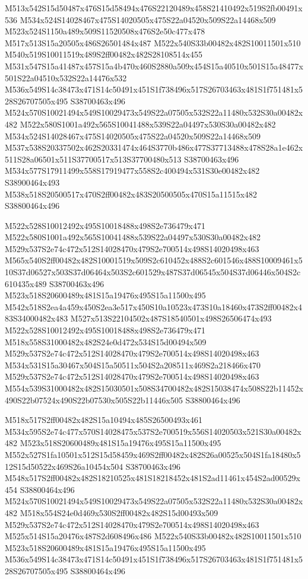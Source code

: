 \documentclass{article}
\begin{document}
\begin{multicols}{2}
M513x542S15d50487x476S15d58494x476S22120489x458S21410492x519S2fb00491x536 M534x524S14028467x475S14020505x475S22a04520x509S22a14468x509 M523x524S1150a489x509S11520508x476S2e50c477x478 M517x513S15a20505x486S26501484x487 M522x540S33b00482x482S10011501x510 M540x519S10011519x489S2ff00482x482S28108514x455 M531x547S15a41487x457S15a4b470x460S2880a509x454S15a40510x501S15a48477x501S22a04510x532S22a14476x532 M536x549S14c38473x471S14c50491x451S1f738496x517S26703463x481S1f751481x528S26707505x495 S38700463x496 M524x570S10021494x549S10029473x549S22a07505x532S22a11480x532S30a00482x482 M522x580S1001a492x565S10041488x539S22a04497x530S30a00482x482 M534x524S14028467x475S14020505x475S22a04520x509S22a14468x509 M537x538S20337502x462S20331474x464S3770b486x477S37713488x478S28a1e462x511S28a06501x511S37700517x513S37700480x513 S38700463x496 M534x577S17911499x558S17919477x558S2c400494x531S30e00482x482 S38900464x493 M538x518S20500517x470S2ff00482x483S20500505x470S15a11515x482 S38800464x496

M522x528S10012492x495S10018488x498S2e736479x471 M522x580S1001a492x565S10041488x539S22a04497x530S30a00482x482 M529x537S2e74c472x512S14028470x479S2e700514x498S14020498x463 M565x540S2ff00482x482S10001519x509S2c610452x488S2c601546x488S10009461x510S37d06527x503S37d06464x503S2c601529x487S37d06545x504S37d06446x504S2c610435x489 S38700463x496 M523x518S20600489x481S15a19476x495S15a11500x495 M542x518S2ea4a459x450S2ea3e517x450S10a10523x473S10a18460x473S2ff00482x483S34000482x483 M527x513S22104502x487S18540501x498S26506474x493 M522x528S10012492x495S10018488x498S2e736479x471 M518x558S31000482x482S24e0d472x534S15d00494x509 M529x537S2e74c472x512S14028470x479S2e700514x498S14020498x463 M534x531S15a30467x504S15a50511x504S2a208511x469S2a218466x470 M529x537S2e74c472x512S14028470x479S2e700514x498S14020498x463 M554x539S31000482x482S15030501x508S34700482x482S15038474x508S22b11452x490S22b07524x490S22b07530x505S22b11446x505 S38800464x496

M518x517S2ff00482x482S15a10494x485S26500493x461 M534x595S2e74c477x570S14028475x537S2e700519x556S14020503x521S30a00482x482 M523x518S20600489x481S15a19476x495S15a11500x495 M552x527S1fa10501x512S15d58459x469S2ff00482x482S26a00525x504S1fa18480x512S15d50522x469S26a10454x504 S38700463x496 M548x517S2ff00482x482S18210525x481S18218452x481S2ad11461x454S2ad00529x454 S38800464x496 M524x570S10021494x549S10029473x549S22a07505x532S22a11480x532S30a00482x482 M518x554S24e0d469x530S2ff00482x482S15d00493x509 M529x537S2e74c472x512S14028470x479S2e700514x498S14020498x463 M525x514S15a20476x487S2d608496x486 M522x540S33b00482x482S10011501x510 M523x518S20600489x481S15a19476x495S15a11500x495 M536x549S14c38473x471S14c50491x451S1f738496x517S26703463x481S1f751481x528S26707505x495 S38800464x496


\end{multicols}
\end{document}
